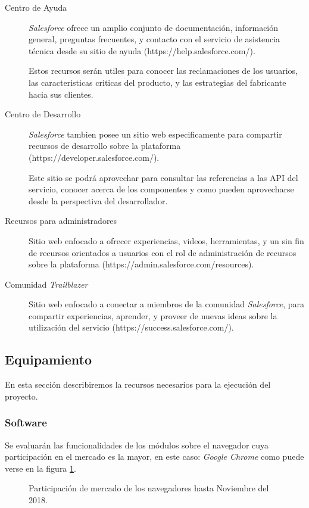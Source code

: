 \begin{description}
\item [Centro de Ayuda] \emph{Salesforce} ofrece un amplio conjunto de
documentación, información general, preguntas frecuentes, y contacto con el
servicio de asistencia técnica desde su sitio de ayuda
(https://help.salesforce.com/).

Estos recursos serán utiles para conocer las reclamaciones de los usuarios, las
caracteristicas criticas del producto, y las estrategias del fabricante hacia
sus clientes.

\item [Centro de Desarrollo] \emph{Salesforce} tambien posee un sitio web
especificamente para compartir recursos de desarrollo sobre la plataforma
(https://developer.salesforce.com/).

Este sitio se podrá aprovechar para consultar las referencias a las API del
servicio, conocer acerca de los componentes y como pueden aprovecharse desde la
perspectiva del desarrollador.

\item [Recursos para administradores] Sitio web enfocado a ofrecer experiencias,
videos, herramientas, y un sin fin de recursos orientados a usuarios con el rol
de administración de recursos sobre la plataforma
(https://admin.salesforce.com/resources).

\item [Comunidad \emph{Trailblazer}] Sitio web enfocado a conectar a miembros de
la comunidad \emph{Salesforce}, para compartir experiencias, aprender, y proveer
de nuevas ideas sobre la utilización del servicio
(https://success.salesforce.com/).

\end{description}

\subsection{Equipamiento}
En esta sección describiremos la recursos necesarios para la ejecución del
proyecto.

\subsubsection{Software}
Se evaluarán las funcionalidades de los módulos sobre el navegador cuya
participación en el mercado es la mayor, en este caso: \emph{Google Chrome}
como puede verse en la figura \ref{software}.

\begin{figure}
\centering

\caption{Participación de mercado de los navegadores hasta Noviembre del 2018.}
\label{software}
\end{figure}

